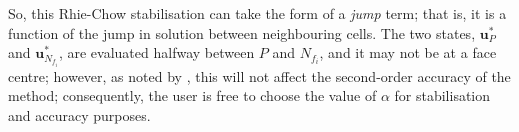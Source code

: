 \documentclass[sn-mathphys,Numbered]{sn-jnl}%
\newcommand{\bb}{\boldsymbol}
\begin{document}
So, this Rhie-Chow stabilisation can take the form of a \emph{jump} term; that is, it is a function of the jump in solution between neighbouring cells.
The two states, $\bb{u}_P^*$ and $\bb{u}_{N_{f_i}}^*$, are evaluated halfway between $P$ and $N_{f_i}$, and it may not be at a face centre; however, as noted by \citet{Nishikawa2010}, this will not affect the second-order accuracy of the method; consequently, the user is free to choose the value of $\alpha$ for stabilisation and accuracy purposes.





%
%
\end{document}
